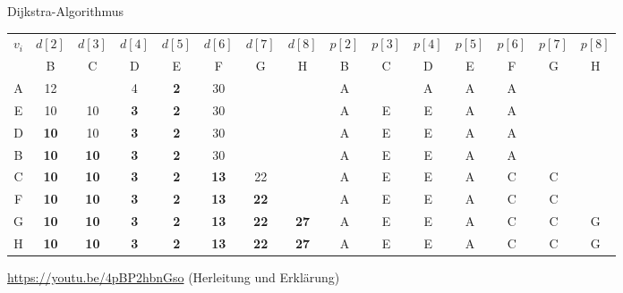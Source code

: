 \documentclass[german]{../spicker}
\begin{document}
\begin{example}{Dijkstra-Algorithmus}
\begin{center}
        \begin{tabular}{|c|ccccccc|ccccccc|}
            \hline
            \multirow{2}{*}{$v_i$} & $d[2]$      & $d[3]$      & $d[4]$     & $d[5]$     & $d[6]$      & $d[7]$      & $d[8]$      & $p[2]$ & $p[3]$ & $p[4]$ & $p[5]$ & $p[6]$ & $p[7]$ & $p[8]$ \\ \cline{2-15}
                                   & B           & C           & D          & E          & F           & G           & H           & B      & C      & D      & E      & F      & G      & H      \\
            \hline
            A                      & 12          &             & 4          & \textbf{2} & 30          &             &             & A      &        & A      & A      & A      &        &        \\
            E                      & 10          & 10          & \textbf{3} & \textbf{2} & 30          &             &             & A      & E      & E      & A      & A      &        &        \\
            D                      & \textbf{10} & 10          & \textbf{3} & \textbf{2} & 30          &             &             & A      & E      & E      & A      & A      &        &        \\
            B                      & \textbf{10} & \textbf{10} & \textbf{3} & \textbf{2} & 30          &             &             & A      & E      & E      & A      & A      &        &        \\
            C                      & \textbf{10} & \textbf{10} & \textbf{3} & \textbf{2} & \textbf{13} & 22          &             & A      & E      & E      & A      & C      & C      &        \\
            F                      & \textbf{10} & \textbf{10} & \textbf{3} & \textbf{2} & \textbf{13} & \textbf{22} &             & A      & E      & E      & A      & C      & C      &        \\
            G                      & \textbf{10} & \textbf{10} & \textbf{3} & \textbf{2} & \textbf{13} & \textbf{22} & \textbf{27} & A      & E      & E      & A      & C      & C      & G      \\
            H                      & \textbf{10} & \textbf{10} & \textbf{3} & \textbf{2} & \textbf{13} & \textbf{22} & \textbf{27} & A      & E      & E      & A      & C      & C      & G      \\
            \hline
        \end{tabular}
    \end{center}

    \vspace{1em}

    \url{https://youtu.be/4pBP2hbnGso} (Herleitung und Erklärung)
\end{example}
\end{document}
